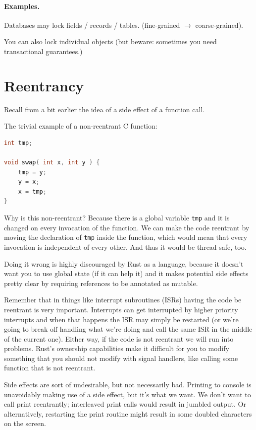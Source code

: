 \documentclass[a4paper]{report}
\begin{document}
\paragraph{Examples.}

    Databases may lock fields / records / tables. (fine-grained $\rightarrow$ coarse-grained).

    You can also lock individual objects (but beware: sometimes you need transactional guarantees.)

\section*{Reentrancy}

Recall from a bit earlier the idea of a side effect of a function call.

The trivial example of a non-reentrant C function:
\begin{lstlisting}[language=C]
int tmp;

void swap( int x, int y ) {
    tmp = y;
    y = x;
    x = tmp;
}
\end{lstlisting}

Why is this non-reentrant? Because there is a global variable \texttt{tmp} and it is changed on every invocation of the function. We can make the code reentrant by moving the declaration of \texttt{tmp} inside the function, which would mean that every invocation is independent of every other. And thus it would be thread safe, too.

Doing it wrong is highly discouraged by Rust as a language, because it doesn't want you to use global state (if it can help it) and it makes potential side effects pretty clear by requiring references to be annotated as mutable.

Remember that in things like interrupt subroutines (ISRs) having the code be reentrant is very important. Interrupts can get interrupted by higher priority interrupts and when that happens the ISR may simply be restarted (or we're going to break off handling what we're doing and call the same ISR in the middle of the current one). Either way, if the code is not reentrant we will run into problems. Rust's ownership capabilities make it difficult for you to modify something that you should not modify with signal handlers, like calling some function that is not reentrant.

Side effects are sort of undesirable, but not necessarily bad. Printing to console is unavoidably making use of a side effect, but it's what we want. We don't want to call print reentrantly; interleaved print calls would result in jumbled output. Or alternatively, restarting the print routine might result in some doubled characters on the screen.
\end{document}
